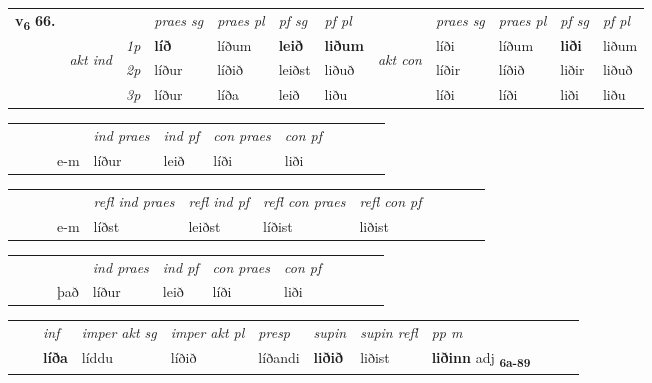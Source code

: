 \begin{tabular}{llllllllllll} \toprule
\multirow{4}{*}{{{\textbf{v{\textsubscript{6}}} \Large{\textbf{66.}}}}}  & &   &  \textit{praes sg}  & \textit{praes pl}  &\textit{ pf sg} & \textit{pf pl} &  &  \textit{praes sg}  & \textit{praes pl}  & \textit{pf sg} & \textit{pf pl } \\*
	\cmidrule{4-7} \cmidrule{9-12}
 & \multirow{3}{*}{\begin{turn}{90}\textit{akt ind}\end{turn}} & {\textit{1p}} & \textbf{líð} & líðum    & \textbf{leið} & \textbf{liðum} & \multirow{3}{*}{\begin{turn}{90}\textit{akt con}\end{turn}} &líði & líðum & \textbf{liði} & liðum\\*
& &  {\textit{2p}} &  líður  & líðið   & leiðst & liðuð & & líðir & líðið & liðir & liðuð \\*
& &  {\textit{3p}} & líður & líða   & leið & liðu & & líði & líði& liði & liðu  \\*
\cmidrule{4-7} \cmidrule{9-12}
\end{tabular}


\begin{tabular}{llllllllllll}
 & &  & &  \textit{ind praes} & \textit{ind pf} & \textit{con praes} & \textit{con pf} \\*
&  & & e-m & líður & leið & líði & liði \\*
\cmidrule{5-9}
\end{tabular}


\begin{tabular}{llllllllllll}
 & &  & &  \textit{refl ind praes} & \textit{refl ind pf} & \textit{refl con praes} & \textit{refl con pf} \\*
&  & & e-m & líðst & leiðst & líðist & liðist \\*
\cmidrule{5-9}
\end{tabular}


\begin{tabular}{llllllllllll}
 & &  & &  \textit{ind praes} & \textit{ind pf} & \textit{con praes} & \textit{con pf} \\*
&  & & það & líður & leið & líði & liði \\*
\cmidrule{5-9}
\end{tabular}


\begin{tabular}{llllllllllll}
 & & \textit{inf} & \textit{imper akt sg} & \textit{imper akt pl}   & \textit{presp} & \textit{supin} & \textit{supin refl} & \textit{pp m}     \\*
  & & \textbf{líða} & líddu  & líðið   & líðandi &  \textbf{liðið} & liðist & \textbf{liðinn} adj \textbf{\textsubscript{6a-89}} \\*
\cmidrule{1-12}
\end{tabular}



